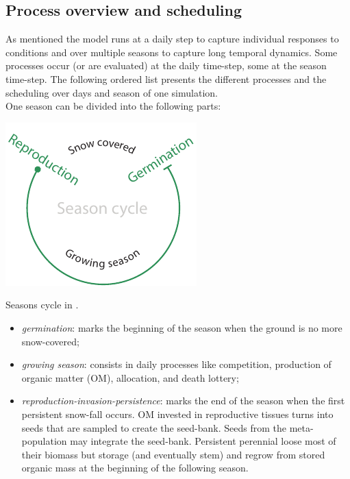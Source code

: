 
\subsection{Process overview and scheduling}

As mentioned the model runs at a daily step to capture individual responses to conditions and over multiple seasons to capture long temporal dynamics. Some processes occur (or are evaluated) at the daily time-step, some at the season time-step. The following ordered list presents the different processes and the scheduling over days and season of one simulation.\\
\indent One season can be divided into the following parts:
\begin{marginfigure}
\includegraphics{./Figures/season_cycle_m.pdf}
\caption{Seasons cycle in \model.}
\end{marginfigure}
\begin{itemize}
\setlength\itemsep{0em}
\item \textit{germination}: marks the beginning of the season when the ground is no more snow-covered;
\item \textit{growing season}: consists in daily processes like competition, production of organic matter (OM), allocation, and death lottery;
\item \textit{reproduction-invasion-persistence}: marks the end of the season when the first persistent snow-fall occurs. OM invested in reproductive tissues turns into seeds that are sampled to create the seed-bank. Seeds from the meta-population may integrate the seed-bank. Persistent perennial loose most of their biomass but storage (and eventually stem) and regrow from stored organic mass at the beginning of the following season.
\end{itemize}

